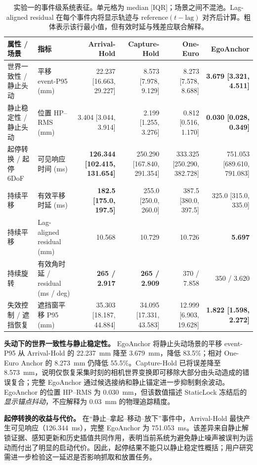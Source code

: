 \documentclass[review]{vgtc}
\begin{document}
\begin{table}[t]
\centering
\caption{实验一的事件级系统表征。单元格为 median [IQR]；场景之间不混池。Lag-aligned residual 在每个事件内将显示轨迹与 $\mathrm{reference}(t-\mathrm{lag})$ 对齐后计算。粗体表示该行最小值，但有效时延与残差应联合解释。}
\label{tab:exp1-compact}
\scriptsize
\setlength{\tabcolsep}{3.2pt}
\begin{tabular}{llrrrr}
\toprule
属性 / 场景 & 指标 & Arrival-Hold & Capture-Hold & One-Euro & EgoAnchor \\
\midrule
世界一致性 / 静止头动 & 平移 event-P95 (mm) & 22.237 [16.663, 29.227] & 8.573 [7.978, 9.129] & 8.273 [7.578, 8.688] & \textbf{3.679 [3.321, 4.511]} \\
静止稳定性 / 静止头动 & 位置 HP--RMS (mm) & 3.404 [3.044, 3.914] & 2.199 [1.255, 3.276] & 0.812 [0.516, 1.170] & \textbf{0.030 [0.028, 0.349]} \\
起停转换 / 起停 6DoF & 可见响应时间 (ms) & \textbf{126.344 [102.415, 131.654]} & 250.290 [167.840, 291.354] & 333.325 [250.290, 382.728] & 751.053 [689.610, 791.083] \\
持续平移 & 有效平移时延 (ms) & \textbf{182.5 [175.0, 197.5]} & 255.0 [250.0, 260.0] & 387.5 [380.0, 397.5] & 325.0 [315.0, 335.0] \\
持续平移 & Lag-aligned residual (mm) & 10.568 & 10.729 & 10.726 & \textbf{5.697} \\
持续旋转 & 有效角时延 / residual (ms / deg) & \textbf{265 / 2.917} & \textbf{265 / 2.909} & 370 / 7.858 & 350 / 3.620 \\
失效控制 / 遮挡恢复 & 遮挡窗平移 P95 (mm) & 35.303 [18.187, 44.884] & 34.095 [17.331, 43.583] & 12.999 [6.903, 19.628] & \textbf{1.822 [1.598, 2.272]} \\
\bottomrule
\end{tabular}
\end{table}



\textbf{头动下的世界一致性与静止稳定性。}
EgoAnchor 将静止头动场景的平移 event-P95 从 Arrival-Hold 的 22.237~mm 降至 3.679~mm，降低 83.5\%；相对 One-Euro Anchor 的 8.273~mm 仍降低 55.5\%。Capture-Hold 已将误差降至 8.573~mm，说明仅恢复采集时刻的相机世界变换即可移除大部分由头动造成的错误复合；完整 EgoAnchor 通过候选接纳和静止锚定进一步抑制剩余波动。EgoAnchor 的位置 HP--RMS 为 0.030~mm，但该数值描述 StaticLock 冻结后的\emph{显示锚点抖动}，不应解释为 0.03~mm 的物理追踪精度。

\textbf{起停转换的收益与代价。}
在“静止--拿起--移动--放下”事件中，Arrival-Hold 最快产生可见响应（126.344~ms），完整 EgoAnchor 为 751.053~ms。该差异来自静止解锁证据、感知更新和历史插值共同作用，表明当前系统为避免静止噪声被误判为运动而付出了明显的启动代价。因此，起停结果不能只以静止稳定性概括；用户研究需进一步检验这一延迟是否影响抓取和放置任务。
\end{document}
